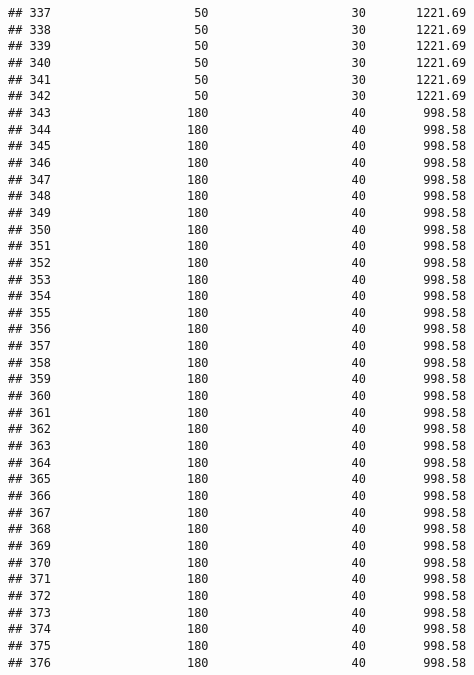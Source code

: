\documentclass[]{article}
\begin{document}
\begin{verbatim}
## 337                    50                    30       1221.69
## 338                    50                    30       1221.69
## 339                    50                    30       1221.69
## 340                    50                    30       1221.69
## 341                    50                    30       1221.69
## 342                    50                    30       1221.69
## 343                   180                    40        998.58
## 344                   180                    40        998.58
## 345                   180                    40        998.58
## 346                   180                    40        998.58
## 347                   180                    40        998.58
## 348                   180                    40        998.58
## 349                   180                    40        998.58
## 350                   180                    40        998.58
## 351                   180                    40        998.58
## 352                   180                    40        998.58
## 353                   180                    40        998.58
## 354                   180                    40        998.58
## 355                   180                    40        998.58
## 356                   180                    40        998.58
## 357                   180                    40        998.58
## 358                   180                    40        998.58
## 359                   180                    40        998.58
## 360                   180                    40        998.58
## 361                   180                    40        998.58
## 362                   180                    40        998.58
## 363                   180                    40        998.58
## 364                   180                    40        998.58
## 365                   180                    40        998.58
## 366                   180                    40        998.58
## 367                   180                    40        998.58
## 368                   180                    40        998.58
## 369                   180                    40        998.58
## 370                   180                    40        998.58
## 371                   180                    40        998.58
## 372                   180                    40        998.58
## 373                   180                    40        998.58
## 374                   180                    40        998.58
## 375                   180                    40        998.58
## 376                   180                    40        998.58

\end{verbatim}
\end{document}
